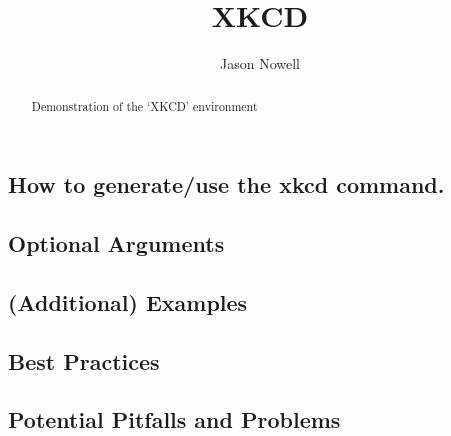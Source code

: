 \documentclass{ximera}
\title{XKCD}
\author{Jason Nowell}
\begin{document}
\begin{abstract}
    Demonstration of the `XKCD' environment
\end{abstract}
\maketitle


    \subsection*{How to generate/use the xkcd command.}
        
        
        
    \subsection*{Optional Arguments}
    
        
        
    \subsection*{(Additional) Examples}
        
        
        
    \subsection*{Best Practices}
    
        
        
    \subsection*{Potential Pitfalls and Problems}   
        
        
        
        
\end{document}
